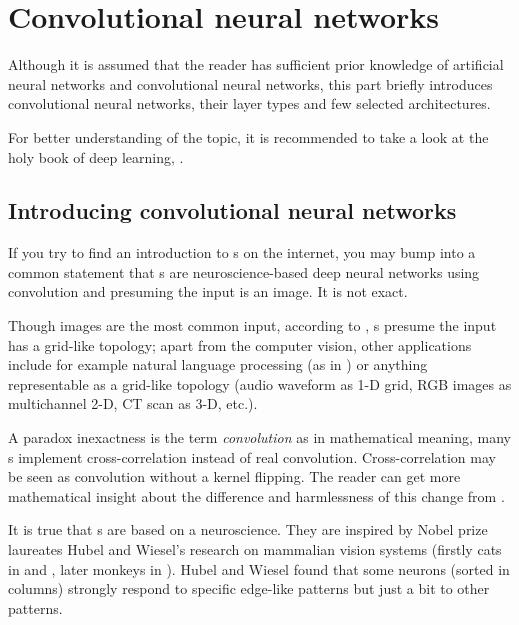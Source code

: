 \chapter{Convolutional neural networks}
\label{cnn}


Although it is assumed that the reader has sufficient prior knowledge of
artificial neural networks and convolutional neural networks, this part briefly 
introduces convolutional neural networks, their layer types and few selected 
architectures. 

For better understanding of the topic, it is recommended to take a look at the 
holy book of deep learning, \cite{dl}.

\section{Introducing convolutional neural networks}
\label{understanding-cnn}

If you try to find an introduction to s on the internet, you may bump 
into a common statement that s are neuroscience-based deep neural
networks using convolution and presuming the input is an image. It is not 
exact. 

Though images are the most common input, according to \cite{dl}, s 
presume the input has a grid-like topology; apart from the computer vision, 
other applications include  for example natural language processing (as in 
\cite{cnn-nlp}) or anything representable as a grid-like topology (audio 
waveform as 1-D grid, RGB images as multichannel 2-D, CT scan as 3-D, etc.). 

A paradox inexactness is the term \textit{convolution} as in mathematical 
meaning, many s implement cross-correlation instead of real convolution. 
Cross-correlation may be seen as convolution without a kernel flipping. The 
reader can get more mathematical insight about the difference and harmlessness 
of this change from \cite{dl}. 

It is true that s are based on a neuroscience. They are inspired by 
Nobel prize laureates Hubel and Wiesel's research on mammalian vision systems 
(firstly cats in \cite{hubel-cats1} and \cite{hubel-cats2}, later monkeys in 
\cite{hubel-monkeys}). Hubel and Wiesel found that some neurons (sorted in 
columns) strongly respond to specific edge-like patterns but just a 
bit to other patterns. 

